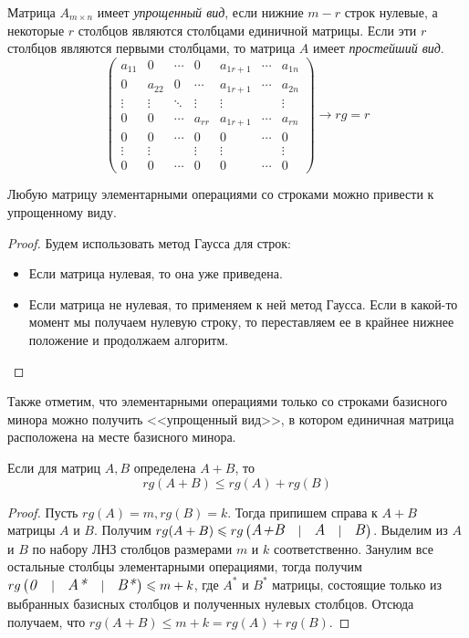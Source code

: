 Матрица $A_{m \times n}$ имеет \emph{упрощенный вид}, если нижние $m-r$ строк нулевые, а некоторые $r$
 столбцов являются столбцами единичной матрицы. Если эти $r$ столбцов являются первыми столбцами, то матрица $A$ имеет \emph{простейший вид}.
\[
\begin{pmatrix}
a_{11} & 0 & \cdots & 0 & a_{1{r+1}} & \cdots & a_{1n} \\
0 & a_{22} & 0 & \cdots & a_{1{r+1}} & \cdots & a_{2n} \\
\vdots & \vdots & \ddots & \vdots & \vdots & & \vdots \\
0 & 0 & \cdots & a_{rr} & a_{1{r+1}} & \cdots & a_{rn} \\
0 & 0 & \cdots & 0 & 0 & \cdots & 0 \\
\vdots & \vdots & & \vdots & \vdots & & \vdots \\
0 & 0 & \cdots & 0 & 0 & \cdots & 0
\end{pmatrix}
\longrightarrow rg =r
\]
\begin{theorem}
    Любую матрицу элементарными операциями со строками можно привести к упрощенному виду.
\end{theorem}
\begin{proof}
    Будем использовать метод Гаусса для строк:
    \begin{itemize}
        \item Если матрица нулевая, то она уже приведена.
        \item Если матрица не нулевая, то применяем к ней метод Гаусса. Если в какой-то момент мы получаем нулевую строку, то переставляем ее в крайнее нижнее положение и продолжаем алгоритм. 
    \end{itemize}
\end{proof}
Также отметим, что элементарными операциями только со строками базисного минора можно получить <<упрощенный вид>>, в котором единичная матрица расположена на месте базисного минора.
\begin{theorem}
    Если для матриц $A, B$ определена $A+B$, то $$rg(A+B) \leqslant rg(A)+rg(B)$$
\end{theorem}
\begin{proof}
    Пусть $rg(A)=m, rg(B)=k$. Тогда припишем справа к $A+B$ матрицы $A$ и $B$. Получим $rg(A+B) \leqslant rg\left( \begin{matrix} \text{\large \textit{A+B}} & |& \text{\large \textit{A}} & |&\text{\large \textit{B}} \end{matrix} \right)$. Выделим из $A$ и $B$ по набору ЛНЗ столбцов размерами $m$ и $k$ соответственно. Занулим все остальные столбцы элементарными операциями, тогда получим $rg\left( \begin{matrix} \text{\large \textit{0}} & |& \text{\large \textit{A*}} & |&\text{\large \textit{B*}} \end{matrix} \right) \leqslant m+k$, где $A^*$ и $B^*$ матрицы, состоящие только из выбранных базисных столбцов и полученных нулевых столбцов. Отсюда получаем, что $rg(A+B) \leqslant m+k=rg(A)+rg(B)$.
\end{proof}
